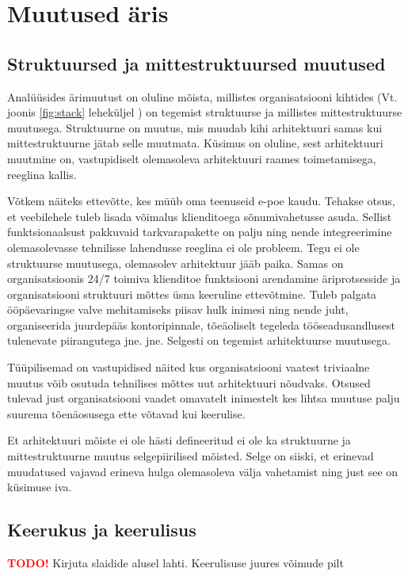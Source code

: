 \documentclass{tufte-book}
\newcommand{\TODO}{\textcolor{red}{\bf TODO!}\xspace}
\begin{document}
\chapter{Muutused äris}

\section{Struktuursed ja mittestruktuursed muutused}
Analüüsides ärimuutust on oluline mõista, millistes organisatsiooni kihtides (Vt. joonis \ref{fig:stack} leheküljel \pageref{fig:stack}) on tegemist struktuurse ja millistes mittestruktuurse muutusega. Struktuurne on muutus, mis muudab kihi arhitektuuri samas kui mittestruktuurne jätab selle muutmata. Küsimus on oluline, sest arhitektuuri muutmine on, vastupidiselt olemasoleva arhitektuuri raames toimetamisega, reeglina kallis.

Võtkem näiteks ettevõtte, kes müüb oma teenuseid e-poe kaudu. Tehakse otsus, et veebilehele tuleb lisada võimalus klienditoega sõnumivahetusse asuda. Sellist funktsionaalsust pakkuvaid tarkvarapakette on palju ning nende integreerimine olemasolevasse tehnilisse lahendusse reeglina ei ole probleem. Tegu ei ole struktuurse muutusega, olemasolev arhitektuur jääb paika. Samas on organisatsioonis 24/7 toimiva klienditoe funktsiooni arendamine äriprotsesside ja organisatsiooni struktuuri mõttes üsna keeruline ettevõtmine. Tuleb palgata ööpäevaringse valve mehitamiseks piisav hulk inimesi ning nende juht, organiseerida juurdepääs kontoripinnale, tõeäoliselt tegeleda tööseadusandlusest tulenevate piirangutega jne. jne. Selgesti on tegemist arhitektuurse muutusega. 

Tüüpilisemad on vastupidised näited kus organisatsiooni vaatest triviaalne muutus võib osutuda tehnilises mõttes uut arhitektuuri nõudvaks. Otsused tulevad just organisatsiooni vaadet omavatelt inimestelt kes lihtsa muutuse palju suurema tõenäosusega ette võtavad kui keerulise. 

Et arhitektuuri mõiste ei ole hästi defineeritud ei ole ka struktuurne ja mittestruktuurne muutus selgepiirilised mõisted. Selge on siiski, et erinevad muudatused vajavad erineva hulga olemasoleva välja vahetamist ning just see on küsimuse iva.

\section{Keerukus ja keerulisus}
\TODO Kirjuta slaidide alusel lahti. Keerulisuse juures võimude pilt
\end{document}
